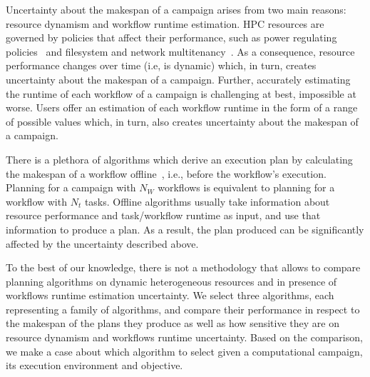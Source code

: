 
Uncertainty about the makespan of a campaign arises from two main reasons:
resource dynamism and workflow runtime estimation. HPC resources are governed by
policies that affect their performance, such as power regulating
policies~\cite{inadomi2015analyzing} and filesystem and network
multitenancy~\cite{brown2018interference}. As a consequence, resource
performance changes over time (i.e, is dynamic) which, in turn, creates
uncertainty about the makespan of a campaign. Further, accurately estimating the
runtime of each workflow of a campaign is challenging at best, impossible at
worse. Users offer an estimation of each workflow runtime in the form of a range
of possible values which, in turn, also creates uncertainty about the makespan
of a campaign. 

There is a plethora of algorithms which derive an execution plan by calculating
the makespan of a workflow offline~\cite{lu2019review}, i.e., before the
workflow's execution. Planning for a campaign with $N_W$ workflows is equivalent
to planning for a workflow with $N_t$ tasks. Offline algorithms usually take
information about resource performance and task/workflow runtime as input, and
use that information to produce a plan. As a result, the plan produced can be
significantly affected by the uncertainty described above.

To the best of our knowledge, there is not a methodology that allows to compare
planning algorithms on dynamic heterogeneous resources and in presence of
workflows runtime estimation uncertainty. We select three algorithms, each
representing a family of algorithms, and compare their performance in respect to
the makespan of the plans they produce as well as how sensitive they are on
resource dynamism and workflows runtime uncertainty. Based on the comparison, we
make a case about which algorithm to select given a computational campaign, its
execution environment and objective. 

